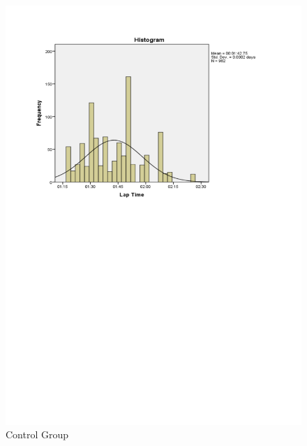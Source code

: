 \begin{figure}
	\centering
	\begin{minipage}{0.45\textwidth}
		\centering
		\includegraphics[width=\textwidth]{charts/1-0}
		Control Group
	\end{minipage}\hfill
	\begin{minipage}{0.45\textwidth}
		\centering

\end{minipage}
\end{figure}
